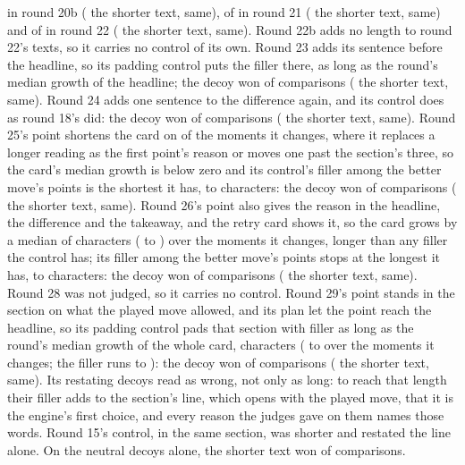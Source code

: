 \documentclass[11pt]{article}
\begin{document}
\PadTwentyN{} in round 20b (\PadTwentyUnchanged{} the shorter text, \PadTwentySame{} same),
\PadTwentyOneDecoy{} of \PadTwentyOneN{} in round 21 (\PadTwentyOneUnchanged{} the shorter text,
\PadTwentyOneSame{} same) and \PadTwentyTwoDecoy{} of \PadTwentyTwoN{} in round 22
(\PadTwentyTwoUnchanged{} the shorter text, \PadTwentyTwoSame{} same). Round 22b adds no length to
round 22's texts, so it carries no control of its own. Round 23 adds its sentence before the
headline, so its padding control puts the filler there, as long as the round's median growth of the
headline; the decoy won \PadTwentyThreeDecoy{} of \PadTwentyThreeN{} comparisons
(\PadTwentyThreeUnchanged{} the shorter text, \PadTwentyThreeSame{} same). Round 24 adds one
sentence to the difference again, and its control does as round 18's did: the decoy won
\PadTwentyFourDecoy{} of \PadTwentyFourN{} comparisons (\PadTwentyFourUnchanged{} the shorter
text, \PadTwentyFourSame{} same). Round 25's point shortens the card on \PadTwentyFiveShrinks{} of
the \PadTwentyFiveOf{} moments it changes, where it replaces a longer reading as the first point's
reason or moves one past the section's three, so the card's median growth is below zero and its
control's filler among the better move's points is the shortest it has, \PadTwentyFiveFillerMin{}
to \PadTwentyFiveFillerMax{} characters: the decoy won \PadTwentyFiveDecoy{} of \PadTwentyFiveN{}
comparisons (\PadTwentyFiveUnchanged{} the shorter text, \PadTwentyFiveSame{} same). Round 26's
point also gives the reason in the headline, the difference and the takeaway, and the retry card
shows it, so the card grows by a median of \PadTwentySixGrowth{} characters
(\PadTwentySixGrowthMin{} to \PadTwentySixGrowthMax) over the moments it changes, longer than any
filler the control has; its filler among the better move's points stops at the longest it has,
\PadTwentySixFillerMin{} to \PadTwentySixFillerMax{} characters: the decoy won
\PadTwentySixDecoy{} of \PadTwentySixN{} comparisons (\PadTwentySixUnchanged{} the shorter text,
\PadTwentySixSame{} same). Round 28 was not judged, so it carries no control. Round 29's point
stands in the section on what the played move allowed, and its plan let the point reach the
headline, so its padding control pads that section with filler as long as the round's median
growth of the whole card, \PadTwentyNineGrowth{} characters (\PadTwentyNineGrowthMin{} to
\PadTwentyNineGrowthMax{} over the moments it changes; the filler runs \PadTwentyNineFillerMin{}
to \PadTwentyNineFillerMax): the decoy won \PadTwentyNineDecoy{} of \PadTwentyNineN{} comparisons
(\PadTwentyNineUnchanged{} the shorter text, \PadTwentyNineSame{} same). Its \PadTwentyNineRestating{}
restating decoys read as wrong, not only as long: to reach that length their filler adds to the
section's line, which opens with the played move, that it is the engine's first choice, and every
reason the judges gave on them names those words. Round 15's control, in the same section,
was shorter and restated the line alone. On the \PadTwentyNineNeutral{} neutral decoys alone, the
shorter text won \PadTwentyNineNeutralUnchanged{} of \PadTwentyNineNeutralN{} comparisons.
\end{document}
